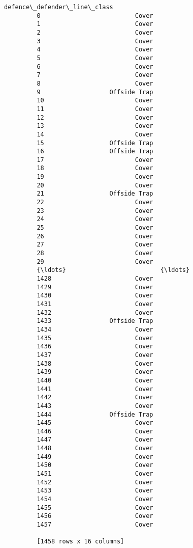 \documentclass[11pt]{article}
\begin{document}
\begin{Verbatim}[commandchars=\\\{\}]
              defence\_defender\_line\_class  
         0                          Cover  
         1                          Cover  
         2                          Cover  
         3                          Cover  
         4                          Cover  
         5                          Cover  
         6                          Cover  
         7                          Cover  
         8                          Cover  
         9                   Offside Trap  
         10                         Cover  
         11                         Cover  
         12                         Cover  
         13                         Cover  
         14                         Cover  
         15                  Offside Trap  
         16                  Offside Trap  
         17                         Cover  
         18                         Cover  
         19                         Cover  
         20                         Cover  
         21                  Offside Trap  
         22                         Cover  
         23                         Cover  
         24                         Cover  
         25                         Cover  
         26                         Cover  
         27                         Cover  
         28                         Cover  
         29                         Cover  
         {\ldots}                          {\ldots}  
         1428                       Cover  
         1429                       Cover  
         1430                       Cover  
         1431                       Cover  
         1432                       Cover  
         1433                Offside Trap  
         1434                       Cover  
         1435                       Cover  
         1436                       Cover  
         1437                       Cover  
         1438                       Cover  
         1439                       Cover  
         1440                       Cover  
         1441                       Cover  
         1442                       Cover  
         1443                       Cover  
         1444                Offside Trap  
         1445                       Cover  
         1446                       Cover  
         1447                       Cover  
         1448                       Cover  
         1449                       Cover  
         1450                       Cover  
         1451                       Cover  
         1452                       Cover  
         1453                       Cover  
         1454                       Cover  
         1455                       Cover  
         1456                       Cover  
         1457                       Cover  
         
         [1458 rows x 16 columns]
\end{Verbatim}
            
\end{document}
